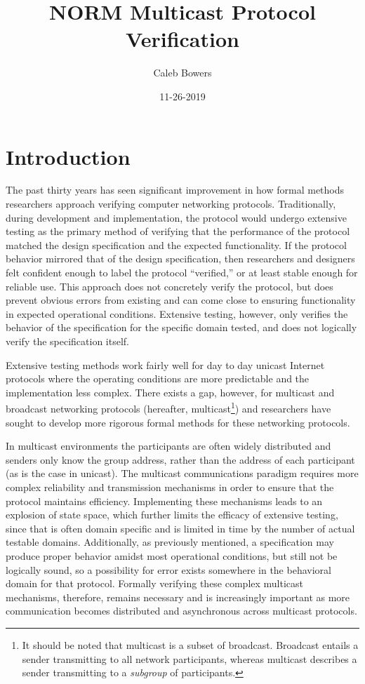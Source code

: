 \documentclass[10pt, journal]{IEEEtran}
\title{NORM Multicast Protocol Verification}
\author{Caleb Bowers}
\date{11-26-2019}
\begin{document}
\maketitle
\begin{abstract}

\end{abstract}

\section{Introduction}
The past thirty years has seen significant improvement in how formal methods researchers approach verifying computer networking protocols. Traditionally, during development and implementation, the protocol would undergo extensive testing as the primary method of verifying that the performance of the protocol matched the design specification and the expected functionality. If the protocol behavior mirrored that of the design specification, then researchers and designers felt confident enough to label the protocol ``verified,'' or at least stable enough for reliable use. This approach does not concretely verify the protocol, but does prevent obvious errors from existing and can come close to ensuring functionality in expected operational conditions. Extensive testing, however, only verifies the behavior of the specification for the specific domain tested, and does not logically verify the specification itself.

Extensive testing methods work fairly well for day to day unicast Internet protocols where the operating conditions are more predictable and the implementation less complex. There exists a gap, however, for multicast and broadcast networking protocols (hereafter, multicast\footnote{It should be noted that multicast is a subset of broadcast. Broadcast entails a sender transmitting to all network participants, whereas multicast describes a sender transmitting to a \textit{subgroup} of participants.}) and researchers have sought to develop more rigorous formal methods for these networking protocols. 

In multicast environments the participants are often widely distributed and senders only know the group address, rather than the address of each participant (as is the case in unicast). The multicast communications paradigm requires more complex reliability and transmission mechanisms in order to ensure that the protocol maintains efficiency. Implementing these mechanisms leads to an explosion of state space, which further limits the efficacy of extensive testing, since that is often domain specific and is limited in time by the number of actual testable domains. Additionally, as previously mentioned, a specification may produce proper behavior amidst most operational conditions, but still not be logically sound, so a possibility for error exists somewhere in the behavioral domain for that protocol. Formally verifying these complex multicast mechanisms, therefore, remains necessary and is increasingly important as more communication becomes distributed and asynchronous across multicast protocols.
\end{document}
